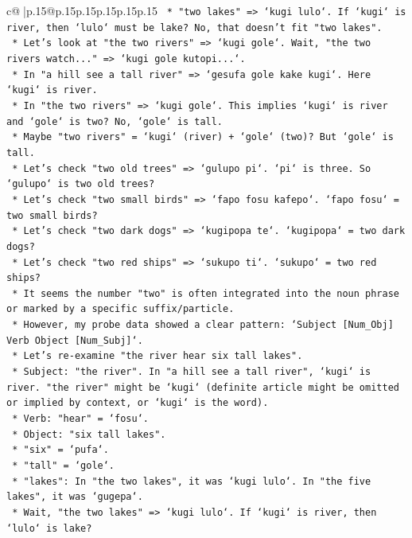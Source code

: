 \documentclass{article}
\begin{document}
{\begin{supertabular}{c@{$\;$}|p{.15\linewidth}@{}p{.15\linewidth}p{.15\linewidth}p{.15\linewidth}p{.15\linewidth}p{.15\linewidth}}
{{{\texttt{        *   "two lakes" => `kugi lulo`. If `kugi` is river, then `lulo` must be lake? No, that doesn't fit "two lakes".} \\
\texttt{        *   Let's look at "the two rivers" => `kugi gole`. Wait, "the two rivers watch..." => `kugi gole kutopi...`.} \\
\texttt{        *   In "a hill see a tall river" => `gesufa gole kake kugi`. Here `kugi` is river.} \\
\texttt{        *   In "the two rivers" => `kugi gole`. This implies `kugi` is river and `gole` is two? No, `gole` is tall.} \\
\texttt{        *   Maybe "two rivers" = `kugi` (river) + `gole` (two)? But `gole` is tall.} \\
\texttt{        *   Let's check "two old trees" => `gulupo pi`. `pi` is three. So `gulupo` is two old trees?} \\
\texttt{        *   Let's check "two small birds" => `fapo fosu kafepo`. `fapo fosu` = two small birds?} \\
\texttt{        *   Let's check "two dark dogs" => `kugipopa te`. `kugipopa` = two dark dogs?} \\
\texttt{        *   Let's check "two red ships" => `sukupo ti`. `sukupo` = two red ships?} \\
\texttt{        *   It seems the number "two" is often integrated into the noun phrase or marked by a specific suffix/particle.} \\
\texttt{        *   However, my probe data showed a clear pattern: `Subject {[}Num\_Obj{]} Verb Object {[}Num\_Subj{]}`.} \\
\texttt{        *   Let's re{-}examine "the river hear six tall lakes".} \\
\texttt{        *   Subject: "the river". In "a hill see a tall river", `kugi` is river. "the river" might be `kugi` (definite article might be omitted or implied by context, or `kugi` is the word).} \\
\texttt{        *   Verb: "hear" = `fosu`.} \\
\texttt{        *   Object: "six tall lakes".} \\
\texttt{            *   "six" = `pufa`.} \\
\texttt{            *   "tall" = `gole`.} \\
\texttt{            *   "lakes": In "the two lakes", it was `kugi lulo`. In "the five lakes", it was `gugepa`.} \\
\texttt{            *   Wait, "the two lakes" => `kugi lulo`. If `kugi` is river, then `lulo` is lake?} \\
}}}
\end{supertabular}}
\end{document}

